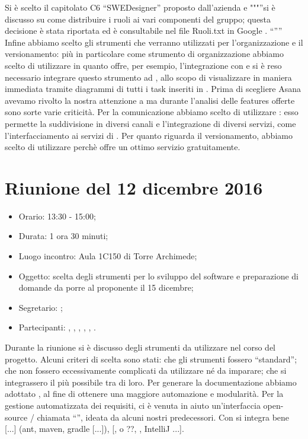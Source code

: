 Si è scelto il capitolato C6 “SWEDesigner” proposto dall'azienda \ZU e """”si è discusso su come distribuire i ruoli ai vari componenti del gruppo; questa decisione è stata riportata ed è consultabile nel file Ruoli.txt in Google . “””
Infine abbiamo scelto gli strumenti che verranno utilizzati per l'organizzazione e il versionamento: più in particolare come strumento di organizzazione abbiamo scelto di utilizzare  in quanto offre, per esempio, l'integrazione con  e si è reso necessario integrare questo strumento ad , allo scopo di visualizzare in maniera immediata tramite diagrammi di  tutti i task inseriti in . Prima di scegliere Asana avevamo rivolto la nostra attenzione a  ma durante l'analisi delle features offerte sono sorte varie criticità. Per la comunicazione abbiamo scelto di utilizzare : esso permette la suddivisione in diversi canali e l'integrazione di diversi servizi, come l'interfacciamento ai servizi di . Per quanto riguarda il versionamento, abbiamo scelto di utilizzare   perchè offre un ottimo servizio gratuitamente.



\section{Riunione del 12 dicembre 2016}

\begin{itemize}
	\item Orario: 13:30 - 15:00;
	\item Durata: 1 ora 30 minuti;
	\item Luogo incontro: Aula 1C150 di Torre Archimede; 
	\item Oggetto: scelta degli strumenti per lo sviluppo del software e preparazione di domande da porre al proponente il 15 dicembre;
	\item Segretario: \PB; 
	\item Partecipanti: \AZ, \GG, \LB, \LS, \MM, \PB.
\end{itemize}

Durante la riunione si è discusso degli strumenti da utilizzare nel corso del progetto. Alcuni criteri di scelta sono stati: che gli strumenti fossero “standard”; che non fossero eccessivamente complicati da utilizzare né da imparare; che si integrassero il più possibile tra di loro. Per generare la documentazione abbiamo adottato , al fine di ottenere una maggiore automazione e modularità. Per la gestione automatizzata dei requisiti, ci è venuta in aiuto un'interfaccia open-source / chiamata “”, ideata da alcuni nostri predecessori. Con  si integra bene  [...] (ant, maven, gradle [...]), [,  o ??, , IntelliJ ...].

